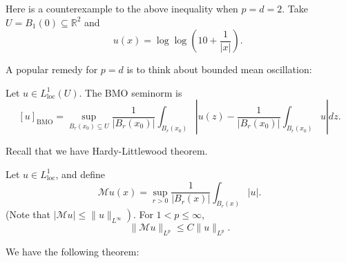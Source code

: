  \begin{example}
    Here is a counterexample to the above inequality when $p=d=2$. Take $U=B_{1}(0) \subseteq \mathbb{R}^{2}$ and
    $$
    u(x)=\log \log \left(10+\frac{1}{|x|}\right) \text {. }
    $$
 
 \end{example}

 A popular remedy for $p=d$ is to think about bounded mean oscillation:

 \begin{definition}
Let $u \in L_{\mathrm{loc}}^{1}(U)$. The BMO seminorm is
 $$
 [u]_{\mathrm{BMO}}=\sup _{B_{r}\left(x_{0}\right) \subseteq U} \frac{1}{\left|B_{r}\left(x_{0}\right)\right|} \int_{B_{r}\left(x_{0}\right)}\left|u(z)-\frac{1}{\left|B_{r}\left(x_{0}\right)\right|} \int_{B_{r}\left(x_{0}\right)} u\right| d z .
 $$
 \end{definition}

 Recall that we have Hardy-Littlewood theorem. 
\begin{theorem}
\label{thm:Hardy-Littlewood}
Let $u \in L_{\mathrm{loc}}^{1}$, and define
$$
\mathcal{M} u(x)=\sup _{r>0} \frac{1}{\left|B_{r}(x)\right|} \int_{B_{r}(x)}|u| .
$$
(Note that $\left.|\mathcal{M} u| \leq\|u\|_{L^{\infty}}\right)$. For $1<p \leq \infty$,
$$
\|\mathcal{M} u\|_{L^{p}} \leq C\|u\|_{L^{p}} .
$$
\end{theorem}
 
 We have the following theorem: 

